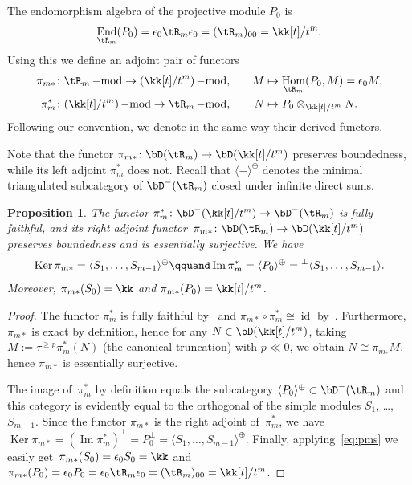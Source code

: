\documentclass[11pt]{amsart}
\DeclareMathOperator{\Hom}{\mathrm{Hom}}
\DeclareMathOperator{\End}{\mathrm{End}}
\DeclareMathOperator{\Ker}{\mathrm{Ker}}
\DeclareMathOperator{\Ima}{\mathrm{Im}}
\DeclareMathOperator{\id}{\mathrm{id}}
\DeclareMathOperator{\mmod}{\mathrm{-mod}}
\theoremstyle{plain}
\newtheorem{proposition}[theorem]{Proposition}
\theoremstyle{definition}
\theoremstyle{remark}
\begin{document}
The endomorphism algebra of the projective module $P_0$ is
\begin{equation*}
\End_{\tR_m}(P_0) = \epsilon_0 \tR_m \epsilon_0 = (\tR_m)_{00} = \kk[t]/t^m.
\end{equation*}
Using this we define an adjoint pair of functors
\begin{equation}
\label{eq:pms}
\begin{aligned}
\pi_{m*} & \colon \tR_m\mmod \to (\kk[t]/t^m)\mmod, \quad & M & \mapsto \Hom_{\tR_m}(P_0,M) = \epsilon_0 M,\\
\pi_m^* & \colon (\kk[t]/t^m)\mmod \to \tR_m\mmod, \quad & N & \mapsto P_0 \otimes_{\kk[t]/t^m} N.
\end{aligned}
\end{equation} 
Following our convention, we denote in the same way their derived functors.

Note that the functor $\pi_{m*} \colon \bD(\tR_m) \to \bD(\kk[t]/t^m)$ preserves boundedness, while its left adjoint $\pi_m^*$ does not.
Recall that $\langle - \rangle^\oplus$ denotes the minimal triangulated subcategory of $\bD^-(\tR_m)$ closed under infinite direct sums.

\begin{proposition}\label{proposition:auslander-localization}
The functor $\pi_m^* \colon \bD^-(\kk[t]/t^m) \to \bD^-(\tR_m)$ is fully faithful, 
and its right adjoint functor~$\pi_{m*} \colon \bD(\tR_m) \to \bD(\kk[t]/t^m)$ preserves boundedness and is essentially surjective. 
We have 
\begin{equation*}
\Ker \pi_{m*} = \langle S_1,\dots,S_{m-1} \rangle^\oplus
\qquand
\Ima \pi_m^* = \langle P_0 \rangle^\oplus = {}^\perp\langle S_1,\dots,S_{m-1} \rangle.
\end{equation*}
Moreover, $\pi_{m*}(S_0) = \kk$ and $\pi_{m*}(P_0) = \kk[t]/t^m$.
\end{proposition}
\begin{proof}
The functor $\pi_m^*$ is fully faithful by~\cite[Theorem~5.23]{kuznetsov2015categorical} 
and $\pi_{m*} \circ \pi_m^* \cong \id$ by~\cite[(48)]{kuznetsov2015categorical}.
Furthermore, $\pi_{m*}$ is exact by definition, hence for any $N \in \bD(\kk[t]/t^m)$, 
taking $M := \tau^{\ge p}\pi_m^*(N)$ (the canonical truncation) with $p \ll 0$, we obtain $N \cong \pi_{m_*}M$, 
hence $\pi_{m*}$ is essentially surjective.

The image of~$\pi_m^*$ by definition equals the subcategory $\langle P_0 \rangle^\oplus \subset \bD^-(\tR_m)$ and
this category is evidently equal to the orthogonal of the simple modules $S_1$, \dots, $S_{m-1}$.
Since the functor $\pi_{m*}$ is the right adjoint of~$\pi_m^*$, 
we have $\Ker \pi_{m*} = (\Ima \pi_m^*)^\perp = P_0^\perp = \langle S_1,\dots,S_{m-1} \rangle^\oplus$.
Finally, applying~\eqref{eq:pms} we easily get~$\pi_{m*}(S_0) = \epsilon_0S_0 = \kk$ 
and $\pi_{m*}(P_0) = \epsilon_0P_0 = \epsilon_0\tR_m\epsilon_0 = (\tR_m)_{00} = \kk[t]/t^m$.
\end{proof}
\end{document}
